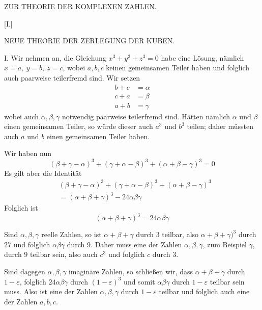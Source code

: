 %
%
\clearpage
\renewcommand{\BookRunningTitle}{Zur Theorie der komplexen Zahlen}
\begin{center}\Large ZUR THEORIE DER KOMPLEXEN ZAHLEN.\end{center}
\begin{center}[I.]\par\medskip\large NEUE THEORIE DER ZERLEGUNG DER KUBEN.\end{center}

I. Wir nehmen an, die Gleichung $x^3+y^3+z^3=0$ habe eine Lösung, nämlich $x=a,\ y=b,\ z=c$, wobei $a,b,c$ keinen gemeinsamen Teiler haben und folglich auch paarweise teilerfremd sind. Wir setzen
\[
\begin{aligned}
b+c&=\alpha\\
c+a&=\beta\\
a+b&=\gamma
\end{aligned}
\]
wobei auch $\alpha,\beta,\gamma$ notwendig paarweise teilerfremd sind. Hätten nämlich $\alpha$ und $\beta$ einen gemeinsamen Teiler, so würde dieser auch $a^3$ und $b^3$ teilen; daher müssten auch $a$ und $b$ einen gemeinsamen Teiler haben.

Wir haben nun
\[
(\beta+\gamma-\alpha)^3+(\gamma+\alpha-\beta)^3+(\alpha+\beta-\gamma)^3=0
\]
Es gilt aber die Identität
\[
\begin{aligned}
&(\beta+\gamma-\alpha)^3+(\gamma+\alpha-\beta)^3+(\alpha+\beta-\gamma)^3\\
&=(\alpha+\beta+\gamma)^3-24\alpha\beta\gamma
\end{aligned}
\]
Folglich ist
\[
(\alpha+\beta+\gamma)^3=24\alpha\beta\gamma
\]

%
Sind $\alpha,\beta,\gamma$ reelle Zahlen, so ist $\alpha+\beta+\gamma$ durch $3$ teilbar, also $\alpha+\beta+\gamma)^3$ durch $27$ und folglich $\alpha\beta\gamma$ durch $9$. Daher muss eine der Zahlen $\alpha,\beta,\gamma$, zum Beispiel $\gamma$, durch $9$ teilbar sein, also auch $c^3$ und folglich $c$ durch $3$.

Sind dagegen $\alpha,\beta,\gamma$ imaginäre Zahlen, so schließen wir, dass $\alpha+\beta+\gamma$ durch $1-\varepsilon$, folglich $24\alpha\beta\gamma$ durch $(1-\varepsilon)^3$ und somit $\alpha\beta\gamma$ durch $1-\varepsilon$ teilbar sein muss. Also ist eine der Zahlen $\alpha,\beta,\gamma$ durch $1-\varepsilon$ teilbar und folglich auch eine der Zahlen $a,b,c$.

